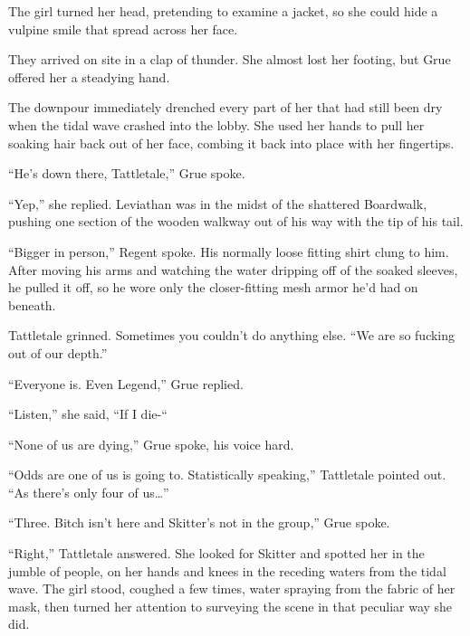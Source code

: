 The girl turned her head, pretending to examine a jacket, so she could hide a vulpine smile that spread across her face.



\blacksquare



They arrived on site in a clap of thunder.  She almost lost her footing, but Grue offered her a steadying hand.



The downpour immediately drenched every part of her that had still been dry when the tidal wave crashed into the lobby.  She used her hands to pull her soaking hair back out of her face, combing it back into place with her fingertips.



``He's down there, Tattletale,'' Grue spoke.



``Yep,'' she replied.  Leviathan was in the midst of the shattered Boardwalk, pushing one section of the wooden walkway out of his way with the tip of his tail.



``Bigger in person,'' Regent spoke.  His normally loose fitting shirt clung to him.  After moving his arms and watching the water dripping off of the soaked sleeves, he pulled it off, so he wore only the closer-fitting mesh armor he'd had on beneath.



Tattletale grinned.  Sometimes you couldn't do anything else.  ``We are so fucking out of our depth.''



``Everyone is.  Even Legend,'' Grue replied.



``Listen,'' she said, ``If I die-``



``None of us are dying,'' Grue spoke, his voice hard.



``Odds are one of us is going to.  Statistically speaking,'' Tattletale pointed out.  ``As there's only four of us\ldots''



``Three.  Bitch isn't here and Skitter's not in the group,'' Grue spoke.



``Right,'' Tattletale answered.  She looked for Skitter and spotted her in the jumble of people, on her hands and knees in the receding waters from the tidal wave.  The girl stood, coughed a few times, water spraying from the fabric of her mask, then turned her attention to surveying the scene in that peculiar way she did.



